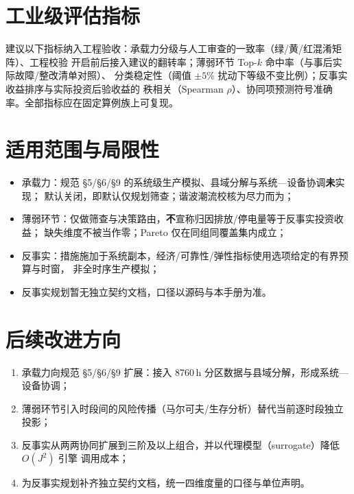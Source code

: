 \documentclass[UTF8,fontset=fandol,a4paper,11pt]{ctexart}
\begin{document}
\section{工业级评估指标}
建议以下指标纳入工程验收：承载力分级与人工审查的一致率（绿/黄/红混淆矩阵）、工程校验
开启前后接入建议的翻转率；薄弱环节 Top-$k$ 命中率（与事后实际故障/整改清单对照）、
分类稳定性（阈值 $\pm5\%$ 扰动下等级不变比例）；反事实收益排序与实际投资后验收益的
秩相关（Spearman $\rho$）、协同项预测符号准确率。全部指标应在固定算例族上可复现。

\section{适用范围与局限性}\label{sec:limits}
\begin{itemize}
  \item 承载力：规范 §5/§6/§9 的系统级生产模拟、县域分解与系统—设备协调\textbf{未}实现；
         默认关闭，即默认仅规划筛查；谐波潮流校核为尽力而为；
  \item 薄弱环节：仅做筛查与决策路由，\textbf{不}宣称归因排放/停电量等于反事实投资收益；
        缺失维度不被当作零；Pareto 仅在同组同覆盖集内成立；
  \item 反事实：措施施加于系统副本，经济/可靠性/弹性指标使用选项给定的有界预算与时窗，
        非全时序生产模拟；
  \item 反事实规划暂无独立契约文档，口径以源码与本手册为准。
\end{itemize}

\section{后续改进方向}
\begin{enumerate}
  \item 承载力向规范 §5/§6/§9 扩展：接入 8760\,h 分区数据与县域分解，形成系统—设备协调；
  \item 薄弱环节引入时段间的风险传播（马尔可夫/生存分析）替代当前逐时段独立投影；
  \item 反事实从两两协同扩展到三阶及以上组合，并以代理模型（surrogate）降低 $O(J^2)$ 引擎
        调用成本；
  \item 为反事实规划补齐独立契约文档，统一四维度量的口径与单位声明。
\end{enumerate}




\end{document}
